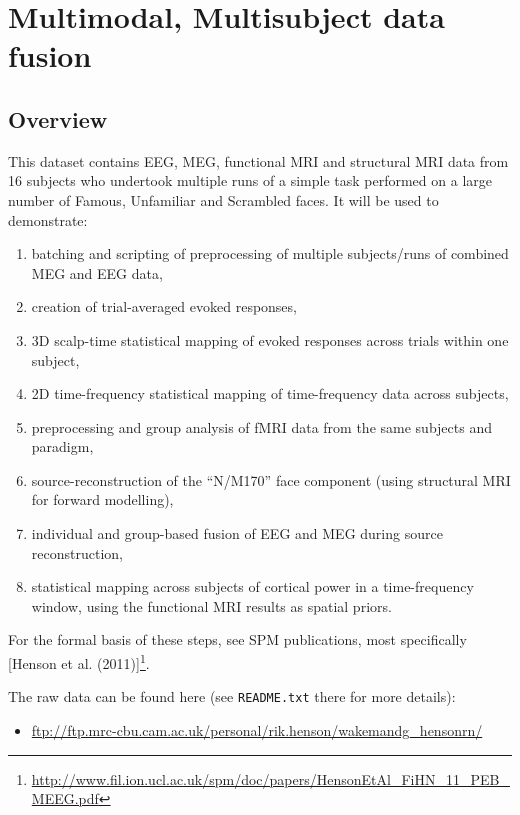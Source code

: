 \chapter{Multimodal, Multisubject data fusion \label{Chap:data:multi}}

\section{Overview}

This dataset contains EEG, MEG, functional MRI and structural MRI data from 16 subjects who undertook multiple runs of a simple task performed on a large number of Famous, Unfamiliar and Scrambled faces. It will be used to demonstrate:

\begin{enumerate}
	\item batching and scripting of preprocessing of multiple subjects/runs of combined MEG and EEG data,
	\item creation of trial-averaged evoked responses,
	\item 3D scalp-time statistical mapping of evoked responses across trials within one subject,
	\item 2D time-frequency statistical mapping of time-frequency data across subjects, 
	\item preprocessing and group analysis of fMRI data from the same subjects and paradigm,
	\item source-reconstruction of the ``N/M170'' face component (using structural MRI for forward modelling),
	\item individual and group-based fusion of EEG and MEG during source reconstruction,
	\item statistical mapping across subjects of cortical power in a time-frequency window, using the functional MRI results as spatial priors.
\end{enumerate}

For the formal basis of these steps, see SPM publications, most specifically [Henson et al. (2011)]\footnote{\url{http://www.fil.ion.ucl.ac.uk/spm/doc/papers/HensonEtAl_FiHN_11_PEB_MEEG.pdf}}.

The raw data can be found here (see \texttt{README.txt} there for more details):

\begin{itemize}
	\item[] \url{ftp://ftp.mrc-cbu.cam.ac.uk/personal/rik.henson/wakemandg_hensonrn/}
\end{itemize}

